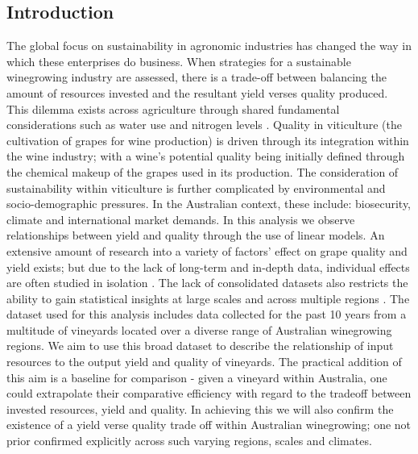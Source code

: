 \documentclass[review,12pt,authoryear]{elsarticle}
\begin{document}
\begin{linenumbers}
\section{Introduction}
The global focus on sustainability in agronomic industries has changed the way in which these enterprises do business. When strategies for a sustainable winegrowing industry are assessed, there is a trade-off between balancing the amount of resources invested and the resultant yield verses quality produced. This dilemma exists across agriculture through shared fundamental considerations such as water use and nitrogen levels \citep{hemmingCherryTomatoProduction2020,kawasakiQualityMattersMore2016, zhuEffectsNitrogenLevel2017}. Quality in viticulture (the cultivation of grapes for wine production) is driven through its integration within the wine industry; with a wine's potential quality being initially defined through the chemical makeup of the grapes used in its production. The consideration of sustainability within viticulture is further complicated by environmental and socio-demographic pressures. In the Australian context, these include: biosecurity, climate and international market demands.
\newline
In this analysis we observe relationships between yield and quality through the use of linear models. An extensive amount of research into a variety of factors' effect on grape quality and yield exists; but due to the lack of long-term and in-depth data, individual effects are often studied in isolation \citep{abbalDecisionSupportSystem2016}. The lack of consolidated datasets also restricts the ability to gain statistical insights at large scales and across multiple regions \citep{keithjonesAustralianWineIndustry2002,knightFirmResourcesDevelopment2019}. The dataset used for this analysis includes data collected for the past 10 years from a multitude of vineyards located over a diverse range of Australian winegrowing regions.
\newline
We aim to use this broad dataset to describe the relationship of input resources to the output yield and quality of vineyards. The practical addition of this aim is a baseline for comparison - given a vineyard within Australia, one could extrapolate their comparative efficiency with regard to the tradeoff between invested resources, yield and quality. In achieving this we will also confirm the existence of a yield verse quality trade off within Australian winegrowing; one not prior confirmed explicitly across such varying regions, scales and climates. 

\end{linenumbers}
\end{document}
